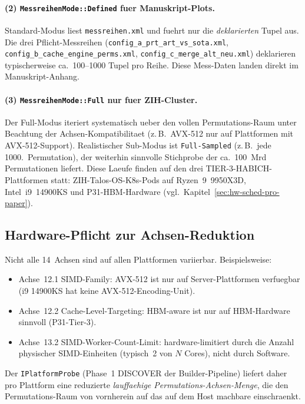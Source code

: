 \paragraph{(2) \texttt{MessreihenMode::Defined} fuer Manuskript-Plots.}
Standard-Modus liest \texttt{messreihen.xml} und fuehrt nur die
\emph{deklarierten} Tupel aus. Die drei Pflicht-Messreihen
(\texttt{config\_a\_prt\_art\_vs\_sota.xml},
\texttt{config\_b\_cache\_engine\_perms.xml},
\texttt{config\_c\_merge\_alt\_neu.xml}) deklarieren typischerweise
ca.~100--1000 Tupel pro Reihe. Diese Mess-Daten landen direkt im
Manuskript-Anhang.

\paragraph{(3) \texttt{MessreihenMode::Full} nur fuer ZIH-Cluster.}
Der Full-Modus iteriert systematisch ueber den vollen Permutations-Raum
unter Beachtung der Achsen-Kompatibilitaet (z.\,B.\ AVX-512 nur auf
Plattformen mit AVX-512-Support). Realistischer Sub-Modus ist
\texttt{Full-Sampled} (z.\,B.\ jede 1000.\ Permutation), der weiterhin
sinnvolle Stichprobe der ca.~100~Mrd Permutationen liefert. Diese
Laeufe finden auf den drei TIER-3-HABICH-Plattformen statt:
ZIH-Talos-OS-K8s-Pods auf Ryzen~9~9950X3D, Intel~i9~14900KS und
P31-HBM-Hardware (vgl.\ Kapitel~\ref{sec:hw-sched-pro-paper}).

\subsection{Hardware-Pflicht zur Achsen-Reduktion}

Nicht alle 14~Achsen sind auf allen Plattformen variierbar. Beispielsweise:

\begin{itemize}
    \item Achse~12.1 SIMD-Family: AVX-512 ist nur auf
    Server-Plattformen verfuegbar (i9 14900KS hat keine
    AVX-512-Encoding-Unit).
    \item Achse~12.2 Cache-Level-Targeting: HBM-aware ist nur auf
    HBM-Hardware sinnvoll (P31-Tier-3).
    \item Achse~13.2 SIMD-Worker-Count-Limit: hardware-limitiert
    durch die Anzahl physischer SIMD-Einheiten (typisch~2 von $N$
    Cores), nicht durch Software.
\end{itemize}

Der \texttt{IPlatformProbe} (Phase~1 DISCOVER der Builder-Pipeline)
liefert daher pro Plattform eine reduzierte \emph{lauffaehige
Permutations-Achsen-Menge}, die den Permutations-Raum von vornherein
auf das auf dem Host machbare einschraenkt.
